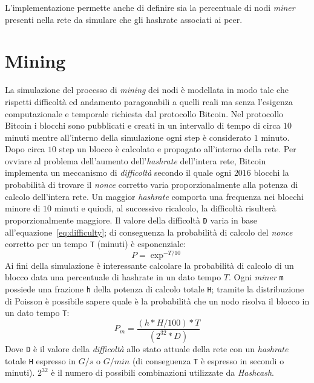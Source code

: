 L'implementazione permette anche di definire sia la percentuale di nodi \textit{miner} presenti nella rete da simulare che gli hashrate associati ai peer.

\section{Mining}
La simulazione del processo di \textit{mining} dei nodi è modellata in modo tale che rispetti difficoltà ed andamento paragonabili a quelli reali ma senza l'esigenza computazionale e temporale richiesta dal protocollo Bitcoin. Nel protocollo Bitcoin i blocchi sono pubblicati e creati in un intervallo di tempo di circa $10$ minuti mentre all'interno della simulazione ogni step è considerato $1$ minuto. Dopo circa $10$ step un blocco è calcolato e propagato all'interno della rete. Per ovviare al problema dell'aumento dell'\textit{hashrate} dell'intera rete, Bitcoin implementa un meccanismo di \textit{difficoltà} secondo il quale ogni $2016$ blocchi la probabilità di trovare il \textit{nonce} corretto varia proporzionalmente alla potenza di calcolo dell'intera rete. Un maggior \textit{hashrate} comporta una frequenza nei blocchi minore di $10$ minuti e quindi, al successivo ricalcolo, la difficoltà risulterà proporzionalmente maggiore.\newline
Il valore della difficoltà \texttt{D} varia in base all'equazione~\ref{eq:difficulty}; di conseguenza la probabilità di calcolo del \textit{nonce} corretto per un tempo \texttt{T} (minuti) è esponenziale:
\begin{equation}
    P = \exp^{-T/10}
\end{equation}
Ai fini della simulazione è interessante calcolare la probabilità di calcolo di un blocco data una percentuale di hashrate in un dato tempo $T$. Ogni \textit{miner} \texttt{m} possiede una frazione \texttt{h} della potenza di calcolo totale \texttt{H}; tramite la distribuzione di Poisson è possibile sapere quale è la probabilità che un nodo risolva il blocco in un dato tempo \texttt{T}:
\begin{equation}\label{eq:mining}
    P_m = \frac{(h * H / 100) * T}{(2^{32} * D)}
\end{equation}
Dove \texttt{D} è il valore della \textit{difficoltà} allo stato attuale della rete con un \textit{hashrate} totale \texttt{H} espresso in $G/s$ o $G/min$ (di conseguenza \texttt{T} è espresso in secondi o minuti). $2^{32}$ è il numero di possibili combinazioni utilizzate da \textit{Hashcash}.\newline
